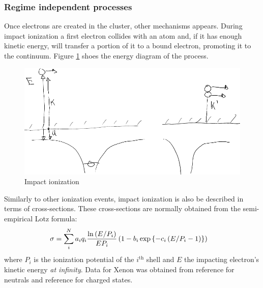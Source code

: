 \subsubsection{Regime independent processes}
\label{section:intro:mechanisms:noregime}
Once electrons are created in the cluster, other mechanisms appears. During
impact ionization a first electron collides with an atom and, if it has enough
kinetic energy, will transfer a portion of it to a bound electron, promoting it
to the continuum. Figure \ref{fig:ionization:impact} shoes the energy diagram
of the process.

\begin{figure}
 \centering
 \includegraphics[width=0.76\columnwidth]{figures/mockups/ionization_impact}
 \caption{Impact ionization}
 \label{fig:ionization:impact}
\end{figure}

Similarly to other ionization events, impact ionization is also be described in
terms of cross-sections. These
cross-sections are normally obtained from the semi-empirical Lotz
formula\cite{Lotz1967}:
\begin{align}
\sigma & = \sum_{i}^{N} a_i q_i \frac{\ln{\left( E/P_i \right)}}{E P_i} \left( 1 - b_i
\exp{ \left\{ -c_i \left( E/P_i - 1 \right) \right\}} \right)
\label{eqn:impact:ionization:lotz}
\end{align}
where $P_i$ is the ionization potential of the $i^{\textrm{th}}$ shell and $E$
the impacting electron's kinetic energy \textit{at infinity}.
Data for Xenon was obtained from reference \cite{Tawara1987} for neutrals
and reference \cite{Heidenreich2005} for charged states.





